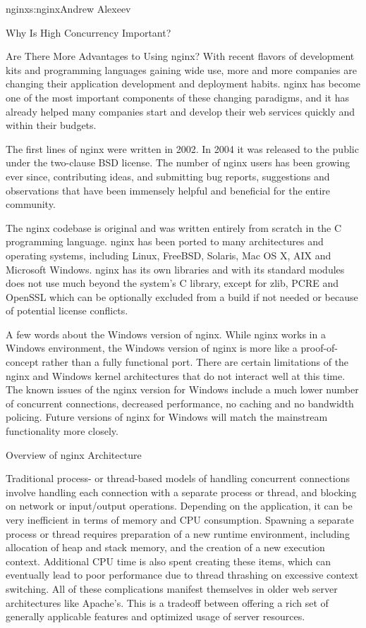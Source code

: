 \begin{aosachapter}{nginx}{s:nginx}{Andrew Alexeev}
\begin{aosasect1}{Why Is High Concurrency Important?}
\begin{aosasect2}{Are There More Advantages to Using nginx?}
With recent flavors of development kits and programming languages
gaining wide use, more and more companies are changing their
application development and deployment habits. nginx has become one of
the most important components of these changing paradigms, and it
has already helped many companies start and develop their web services
quickly and within their budgets.

The first lines of nginx were written in 2002. In 2004 it was released
to the public under the two-clause BSD license. The number of nginx
users has been growing ever since, contributing ideas, and submitting
bug reports, suggestions and observations that have been immensely
helpful and beneficial for the entire community.

The nginx codebase is original and was written entirely from scratch
in the C programming language. nginx has been ported to many
architectures and operating systems, including Linux, FreeBSD,
Solaris, Mac OS X, AIX and Microsoft Windows. nginx has its own
libraries and with its standard modules does not use much beyond the
system's C library, except for zlib, PCRE and OpenSSL which can be
optionally excluded from a build if not needed or because of potential
license conflicts.

A few words about the Windows version of nginx. While nginx works in a
Windows environment, the Windows version of nginx is more like a
proof-of-concept rather than a fully functional port. There are
certain limitations of the nginx and Windows kernel architectures that
do not interact well at this time. The known issues of the nginx
version for Windows include a much lower number of concurrent
connections, decreased performance, no caching and no bandwidth
policing. Future versions of nginx for Windows will match the
mainstream functionality more closely.

\end{aosasect2}

\end{aosasect1}

\begin{aosasect1}{Overview of nginx Architecture}

Traditional process- or thread-based models of handling concurrent
connections involve handling each connection with a separate process
or thread, and blocking on network or input/output
operations. Depending on the application, it can be very inefficient
in terms of memory and CPU consumption. Spawning a separate process or
thread requires preparation of a new runtime environment, including
allocation of heap and stack memory, and the creation of a new
execution context. Additional CPU time is also spent creating these
items, which can eventually lead to poor performance due to thread
thrashing on excessive context switching. All of these complications
manifest themselves in older web server architectures like
Apache's. This is a tradeoff between offering a rich set of generally
applicable features and optimized usage of server resources.


\end{aosasect1}
\end{aosachapter}
